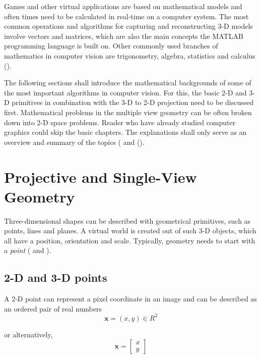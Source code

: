 Games and other virtual applications are based on mathematical models and often times need to be calculated in real-time on a computer system. The most common operations and algorithms for capturing and reconstructing 3-D models involve vectors and matrices, which are also the main concepts the MATLAB programming language is built on. Other commonly used branches of mathematics in computer vision are trigonometry, algebra, statistics and calculus (\cite[p.165]{Gregory.2014}).

The following sections shall introduce the mathematical backgrounds of some of the most important algorithms in computer vision. For this, the basic 2-D and 3-D primitives in combination with the 3-D to 2-D projection need to be discussed first. Mathematical problems in the multiple view geometry can be often broken down into 2-D space problems. Reader who have already studied computer graphics could skip the basic chapters. The explanations shall only serve as an overview and summary of the topics (\cite[p.29]{Szeliski.2011} and (\cite[p.165 et seq.]{Gregory.2014}).
\section{Projective and Single-View Geometry}
Three-dimensional shapes can be described with geometrical primitives, such as points, lines and planes. A virtual world is created out of such 3-D objects, which all have a position, orientation and scale. Typically, geometry needs to start with a \textit{point} (\cite[p.29 et seqq.]{Szeliski.2011} and \cite[p.166 et seqq.]{Gregory.2014}).

\subsection{2-D and 3-D points}\label{ssec:Points}
A 2-D point can represent a pixel coordinate in an image and can be described as an ordered pair of real numbers 
\begin{equation}
\mathbf{x} = (x,y)\in R^2
\end{equation}

or alternatively, 
\begin{equation} 
\mathbf{x}=
  \begin{bmatrix}
   x \\
   y
  \end{bmatrix}
\end{equation}

